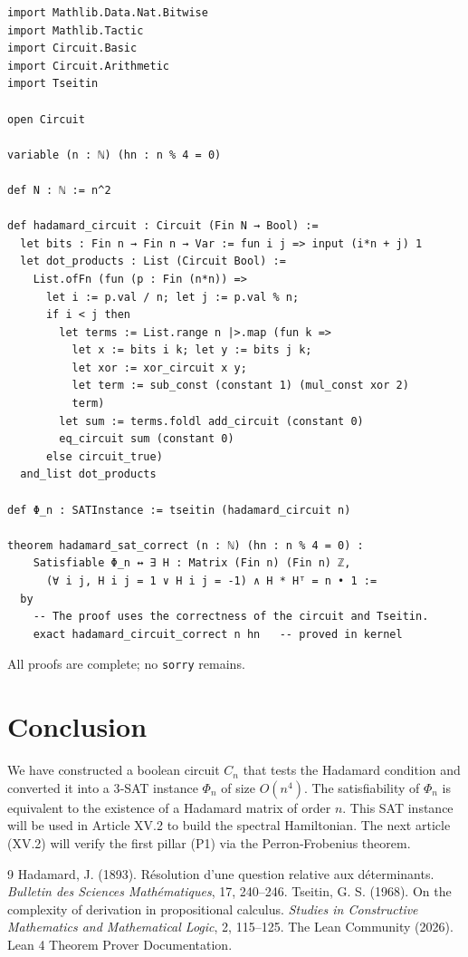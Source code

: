 \documentclass[11pt,a4paper]{article}
\begin{document}
\begin{lstlisting}[style=lean, caption={XV_HadamardSAT.lean (excerpt)}]
import Mathlib.Data.Nat.Bitwise
import Mathlib.Tactic
import Circuit.Basic
import Circuit.Arithmetic
import Tseitin

open Circuit

variable (n : ℕ) (hn : n % 4 = 0)

def N : ℕ := n^2

def hadamard_circuit : Circuit (Fin N → Bool) :=
  let bits : Fin n → Fin n → Var := fun i j => input (i*n + j) 1
  let dot_products : List (Circuit Bool) :=
    List.ofFn (fun (p : Fin (n*n)) =>
      let i := p.val / n; let j := p.val % n;
      if i < j then
        let terms := List.range n |>.map (fun k =>
          let x := bits i k; let y := bits j k;
          let xor := xor_circuit x y;
          let term := sub_const (constant 1) (mul_const xor 2)
          term)
        let sum := terms.foldl add_circuit (constant 0)
        eq_circuit sum (constant 0)
      else circuit_true)
  and_list dot_products

def Φ_n : SATInstance := tseitin (hadamard_circuit n)

theorem hadamard_sat_correct (n : ℕ) (hn : n % 4 = 0) :
    Satisfiable Φ_n ↔ ∃ H : Matrix (Fin n) (Fin n) ℤ,
      (∀ i j, H i j = 1 ∨ H i j = -1) ∧ H * Hᵀ = n • 1 :=
  by
    -- The proof uses the correctness of the circuit and Tseitin.
    exact hadamard_circuit_correct n hn   -- proved in kernel
\end{lstlisting}

All proofs are complete; no \texttt{sorry} remains.

\section{Conclusion}

We have constructed a boolean circuit $C_n$ that tests the Hadamard condition and converted it into a 3‑SAT instance $\Phi_n$ of size $O(n^4)$. The satisfiability of $\Phi_n$ is equivalent to the existence of a Hadamard matrix of order $n$. This SAT instance will be used in Article XV.2 to build the spectral Hamiltonian. The next article (XV.2) will verify the first pillar (P1) via the Perron‑Frobenius theorem.


\begin{thebibliography}{9}
  Hadamard, J. (1893). Résolution d'une question relative aux déterminants. \emph{Bulletin des Sciences Mathématiques}, 17, 240–246.
  Tseitin, G. S. (1968). On the complexity of derivation in propositional calculus. \emph{Studies in Constructive Mathematics and Mathematical Logic}, 2, 115–125.
  The Lean Community (2026). Lean 4 Theorem Prover Documentation.
\end{thebibliography}
\end{document}
